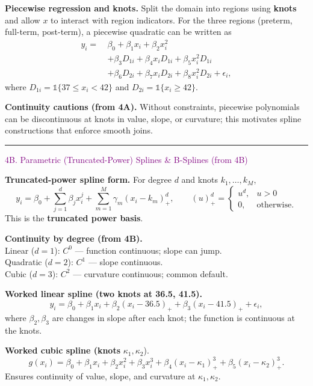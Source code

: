 \documentclass[
  letterpaper,
  DIV=11,
  numbers=noendperiod]{scrreprt}
\begin{document}
\textbf{Piecewise regression and knots.} Split the domain into regions
using \textbf{knots} and allow \(x\) to interact with region indicators.
For the three regions (preterm, full-term, post-term), a piecewise
quadratic can be written as \[
\begin{aligned}
y_i=\ &\beta_0+\beta_1 x_i+\beta_2 x_i^2\\
&+\beta_3 D_{1i}+\beta_4 x_i D_{1i}+\beta_5 x_i^2 D_{1i}\\
&+\beta_6 D_{2i}+\beta_7 x_i D_{2i}+\beta_8 x_i^2 D_{2i}+\epsilon_i,
\end{aligned}
\] where \(D_{1i}=\mathbb{1}\{37\le x_i<42\}\) and
\(D_{2i}=\mathbb{1}\{x_i\ge 42\}\).

\textbf{Continuity cautions (from 4A).} Without constraints, piecewise
polynomials can be discontinuous at knots in value, slope, or curvature;
this motivates spline constructions that enforce smooth joins.

\begin{center}\rule{0.5\linewidth}{0.5pt}\end{center}

\textcolor{purple}{4B. Parametric (Truncated-Power) Splines & B-Splines (from 4B)}

\textbf{Truncated-power spline form.} For degree \(d\) and knots
\(k_1,\dots,k_M\), \[
y_i=\beta_0+\sum_{j=1}^d \beta_j x_i^j+\sum_{m=1}^M \gamma_m (x_i-k_m)^d_{+},\qquad
(u)^d_{+}=\begin{cases}u^d,&u>0\\ 0,&\text{otherwise.}\end{cases}
\] This is the \textbf{truncated power basis}.

\textbf{Continuity by degree (from 4B).}\\
Linear (\(d=1\)): \(C^0\) --- function continuous; slope can jump.\\
Quadratic (\(d=2\)): \(C^1\) --- slope continuous.\\
Cubic (\(d=3\)): \(C^2\) --- curvature continuous; common default.

\textbf{Worked linear spline (two knots at 36.5, 41.5).} \[
y_i=\beta_0+\beta_1 x_i+\beta_2 (x_i-36.5)_{+}+\beta_3 (x_i-41.5)_{+}+\epsilon_i,
\] where \(\beta_2,\beta_3\) are changes in slope after each knot; the
function is continuous at the knots.

\textbf{Worked cubic spline (knots} \(\kappa_1,\kappa_2\)). \[
g(x_i)=\beta_0+\beta_1 x_i+\beta_2 x_i^2+\beta_3 x_i^3+\beta_4 (x_i-\kappa_1)^3_{+}+\beta_5 (x_i-\kappa_2)^3_{+}.
\] Ensures continuity of value, slope, and curvature at
\(\kappa_1,\kappa_2\).
\end{document}
